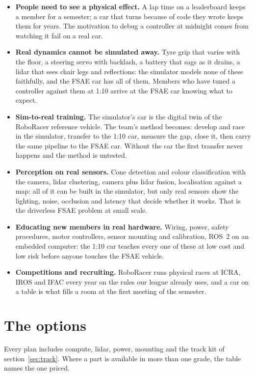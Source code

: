 \documentclass[11pt,a4paper]{article}
\begin{document}
\begin{itemize}
  \item \textbf{People need to see a physical effect.} A lap time on a leaderboard keeps a
  member for a semester; a car that turns because of code they wrote keeps them for years. The
  motivation to debug a controller at midnight comes from watching it fail on a real car.
  \item \textbf{Real dynamics cannot be simulated away.} Tyre grip that varies with the floor,
  a steering servo with backlash, a battery that sags as it drains, a lidar that sees chair
  legs and reflections: the simulator models none of these faithfully, and the FSAE car has
  all of them. Members who have tuned a controller against them at 1:10 arrive at the FSAE car
  knowing what to expect.
  \item \textbf{Sim-to-real training.} The simulator's car is the digital twin of the
  RoboRacer reference vehicle. The team's method becomes: develop and race in the simulator,
  transfer to the 1:10 car, measure the gap, close it, then carry the same pipeline to the
  FSAE car. Without the car the first transfer never happens and the method is untested.
  \item \textbf{Perception on real sensors.} Cone detection and colour classification with
  the camera, lidar clustering, camera plus lidar fusion, localisation against a map: all of it
  can be built in the simulator, but only real sensors show the lighting, noise, occlusion and
  latency that decide whether it works. That is the driverless FSAE problem at small scale.
  \item \textbf{Educating new members in real hardware.} Wiring, power, safety procedures,
  motor controllers, sensor mounting and calibration, ROS~2 on an embedded computer: the
  1:10 car teaches every one of these at low cost and low risk before anyone touches the FSAE
  vehicle.
  \item \textbf{Competitions and recruiting.} RoboRacer runs physical races at ICRA, IROS
  and IFAC every year on the rules our league already uses, and a car on a table is what
  fills a room at the first meeting of the semester.
\end{itemize}

\section{The options}

Every plan includes compute, lidar, power, mounting and the track kit of section~\ref{sec:track}.
Where a part is available in more than one grade, the table names the one priced.
\end{document}
